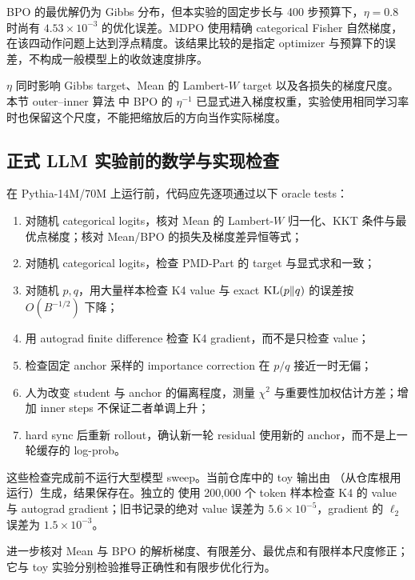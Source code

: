 BPO 的最优解仍为 Gibbs 分布，但本实验的固定步长与 400 步预算下，$\eta=0.8$ 时尚有 $4.53\times10^{-3}$ 的优化误差。MDPO 使用精确 categorical Fisher 自然梯度，在该四动作问题上达到浮点精度。该结果比较的是指定 optimizer 与预算下的误差，不构成一般模型上的收敛速度排序。

$\eta$ 同时影响 Gibbs target、Mean 的 Lambert-$W$ target 以及各损失的梯度尺度。本节 outer--inner 算法 中 BPO 的 $\eta^{-1}$ 已显式进入梯度权重，实验使用相同学习率时也保留这个尺度，不能把缩放后的方向当作实际梯度。

\subsection{正式 LLM 实验前的数学与实现检查}

在 Pythia-14M/70M 上运行前，代码应先逐项通过以下 oracle tests：

\begin{enumerate}
\item 对随机 categorical logits，核对 Mean 的 Lambert-$W$ 归一化、KKT 条件与最优点梯度；核对 Mean/BPO 的损失及梯度差异恒等式；
\item 对随机 categorical logits，检查 PMD-Part 的  target 与显式求和一致；
\item 对随机 $p,q$，用大量样本检查 K4 value 与 exact $\operatorname{KL}(p\Vert q)$ 的误差按 $O(B^{-1/2})$ 下降；
\item 用 autograd finite difference 检查 K4 gradient，而不是只检查 value；
\item 检查固定 anchor 采样的 importance correction 在 $p/q$ 接近一时无偏；
\item 人为改变 student 与 anchor 的偏离程度，测量 $\chi^2$ 与重要性加权估计方差；增加 inner steps 不保证二者单调上升；
\item hard sync 后重新 rollout，确认新一轮 residual 使用新的 anchor，而不是上一轮缓存的 log-prob。
\end{enumerate}

这些检查完成前不运行大型模型 sweep。当前仓库中的 toy 输出由 （从仓库根用  运行）生成，结果保存在。独立的  使用 200,000 个 token 样本检查 K4 的 value 与 autograd gradient；旧书记录的绝对 value 误差为 $5.6\times10^{-5}$，gradient 的 $\ell_2$ 误差为 $1.5\times10^{-3}$。

 进一步核对 Mean 与 BPO 的解析梯度、有限差分、最优点和有限样本尺度修正；它与 toy 实验分别检验推导正确性和有限步优化行为。

